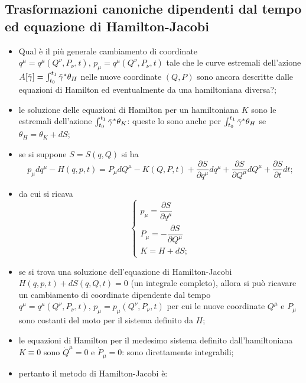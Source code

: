 \documentclass{article}
\theoremstyle{remark}
\begin{document}
\subsection{Trasformazioni canoniche dipendenti dal tempo ed equazione di Hamilton-Jacobi}
\begin{itemize}
    \item Qual è il più generale cambiamento di coordinate $q^\mu=q^\mu(Q^\nu,P_\nu,t),\,p_\mu=q^\mu(Q^\nu,P_\nu,t)$ tale che le curve estremali dell'azione $A[\Tilde{\gamma}]=\int_{t_0}^{t_1}\Tilde{\gamma}^*\theta_H$ nelle nuove coordinate $(Q,P)$ sono ancora descritte dalle equazioni di Hamilton ed eventualmente da una hamiltoniana diversa?;
    \item le soluzione delle equazioni di Hamilton per un hamiltoniana $K$ sono le estremali dell'azione $\int_{t_0}^{t_1}\Tilde{\gamma}^*\theta_K$: queste lo sono anche per $\int_{t_0}^{t_1}\Tilde{\gamma}^*\theta_H$ se $\theta_H=\theta_K+dS$;
    \item se si suppone $S=S(q,Q)$ si ha
    \begin{equation}
    p_\mu dq^\mu-H(q,p,t)=P_\mu dQ^\mu-K(Q,P,t)+\frac{\partial S}{\partial q^\mu}dq^\mu+\frac{\partial S}{\partial Q^\mu}dQ^\mu+\frac{\partial S}{\partial t}dt;
    \end{equation}
    \item da cui si ricava
    \begin{equation}
        \begin{cases}
            p_\mu=\dfrac{\partial S}{\partial q^\mu} \\
            P_\mu=-\dfrac{\partial S}{\partial Q^\mu} \\
            K=H+dS;
        \end{cases}
    \end{equation}
    \item se si trova una soluzione dell'equazione di Hamilton-Jacobi $H(q,p,t)+dS(q,Q,t)=0$ (un integrale completo), allora si può ricavare un cambiamento di coordinate dipendente dal tempo $q^\mu=q^\mu(Q^\nu,P_\nu,t),\,p_\mu=p_\mu(Q^\nu,P_\nu,t)$ per cui le nuove coordinate $Q^\mu$ e $P_\mu$ sono costanti del moto per il sistema definito da $H$;
    \item le equazioni di Hamilton per il medesimo sistema definito dall'hamiltoniana $K\equiv0$ sono $\dot{Q}^\mu=0$ e $\dot{P}_\mu=0$: sono direttamente integrabili;
    \item pertanto il metodo di Hamilton-Jacobi è:
    \begin{enumerate}

\end{enumerate}
\end{itemize}
\end{document}
